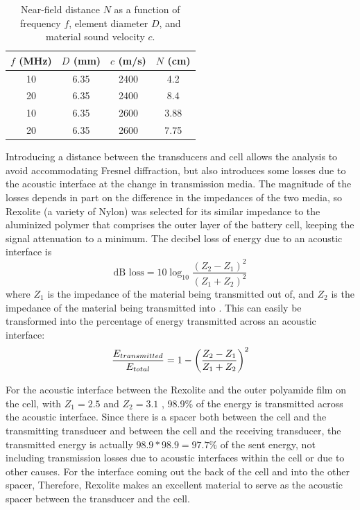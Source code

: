 \begin{table}[h]
    \centering
    \begin{tabular}{c|c|c|c}
         $f$ (MHz) & $D$ (mm) & $c$ (m/s) & $N$ (cm) \\
         \hline
         10 & 6.35 & 2400 & 4.2 \\
         20 & 6.35 & 2400 & 8.4 \\
         10 & 6.35 & 2600 & 3.88 \\
         20 & 6.35 & 2600 & 7.75 \\
    \end{tabular}
    \caption{Near-field distance $N$ as a function of frequency $f$, element diameter $D$, and material sound velocity $c$.}
    \label{tab:nearfield}
\end{table}


Introducing a distance between the transducers and cell allows the analysis to avoid accommodating Fresnel diffraction, but also introduces some losses due to the acoustic interface at the change in transmission media. The magnitude of the losses depends in part on the difference in the impedances of the two media, so Rexolite (a variety of Nylon) was selected for its similar impedance to the aluminized polymer that comprises the outer layer of the battery cell, keeping the signal attenuation to a minimum.
The decibel loss of energy due to an acoustic interface is 
$$\text{dB loss} = 10\log _{10} \frac{(Z_2 - Z_1)^2}{(Z_1 + Z_2)^2}$$
where $Z_1$ is the impedance of the material being transmitted out of, and $Z_2$ is the impedance of the material being transmitted into \cite{OLYMPUS}. This can easily be transformed into the percentage of energy transmitted across an acoustic interface:
$$ \frac{E_{transmitted}}{E_{total}} = 1 - \bigg{(}\frac{Z_2 - Z_1}{Z_1 + Z_2} \bigg{)}^2$$

For the acoustic interface between the Rexolite and the outer polyamide film on the cell, with $Z_1 = 2.5$ \cite{REXOLITE} and $Z_2 = 3.1$ \cite{OLYMPUS}, 98.9\% of the energy is transmitted across the acoustic interface. Since there is a spacer both between the cell and the transmitting transducer and between the cell and the receiving transducer, the transmitted energy is actually $98.9*98.9 = 97.7\%$ of the sent energy, not including transmission losses due to acoustic interfaces within the cell or due to other causes. For the interface coming out the back of the cell and into the other spacer,  Therefore, Rexolite makes an excellent material to serve as the acoustic spacer between the transducer and the cell. 

